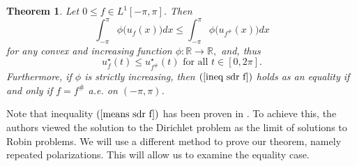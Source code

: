\documentclass[11pt]{amsart}
\newtheorem{theorem}{Theorem}[section]
\numberwithin{equation}{section}
\begin{document}
\begin{theorem}\label{means sdr f}
Let \(0\leq f\in L^1[-\pi,\pi]\). Then
\begin{equation}\label{ineq sdr f}
\int_{-\pi}^\pi \phi\bigl(u_f(x)\bigr)dx\leq\int_{-\pi}^\pi \phi\bigl(u_{f^\#}(x)\bigr)dx
\end{equation}
for any convex and increasing function \(\phi:\mathbb{R}\to\mathbb{R},\) and, thus
\begin{equation}\label{star f}
u_f^\star(t)\leq u^\star_{f^\#}(t) \text{ for all } t\in[0,2\pi].
\end{equation}
Furthermore, if \(\phi\) is strictly increasing, then \((\ref{ineq sdr f})\) holds as an equality if and only if \(f=f^\#\) a.e. on \((-\pi,\pi)\).
\end{theorem}
Note that inequality \((\ref{means sdr f})\) has been proven in \cite[Corollary 3.1]{Langford}. To achieve this, the authors viewed the solution to the Dirichlet problem as the limit of solutions to Robin problems. We will use a different method to prove our theorem, namely repeated polarizations. This will allow us to examine the equality case.
\end{document}
